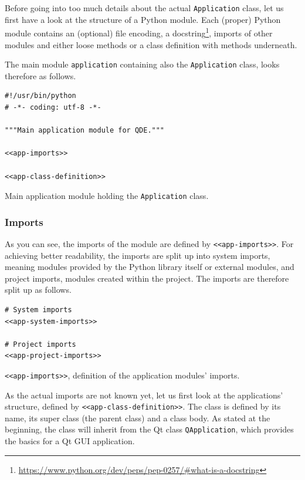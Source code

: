 \documentclass[10pt, openright, notitlepage]{scrreprt}
\begin{document}
Before going into too much details about the actual \texttt{Application} class, let us
first have a look at the structure of a Python module. Each (proper) Python
module contains an (optional) file encoding, a
docstring\footnote{\url{https://www.python.org/dev/peps/pep-0257/\#what-is-a-docstring}},
imports of other modules and either loose methods or a class definition with
methods underneath.

The main module \texttt{application} containing also the \texttt{Application} class, looks
therefore as follows.

\begin{listing}[H]
\begin{verbatim}
#!/usr/bin/python
# -*- coding: utf-8 -*-

"""Main application module for QDE."""

<<app-imports>>

<<app-class-definition>>
\end{verbatim}
\caption{Main application module holding the \texttt{Application} class.}
\end{listing}

\subsubsection{Imports}
\label{sec:orgfb48551}
As you can see, the imports of the module are defined by \texttt{<<app-imports>>}. For
achieving better readability, the imports are split up into system imports,
meaning modules provided by the Python library itself or external modules, and
project imports, modules created within the project. The imports are therefore
split up as follows.

\begin{listing}[H]
\begin{verbatim}
# System imports
<<app-system-imports>>

# Project imports
<<app-project-imports>>
\end{verbatim}
\caption{\label{app-imports}
\texttt{<<app-imports>>}, definition of the application modules' imports.}
\end{listing}

As the actual imports are not known yet, let us first look at the applications'
structure, defined by \texttt{<<app-class-definition>>}. The class is defined by its
name, its super class (the parent class) and a class body. As stated at the
beginning, the class will inherit from the Qt class \texttt{QApplication}, which
provides the basics for a Qt GUI application.
\end{document}
